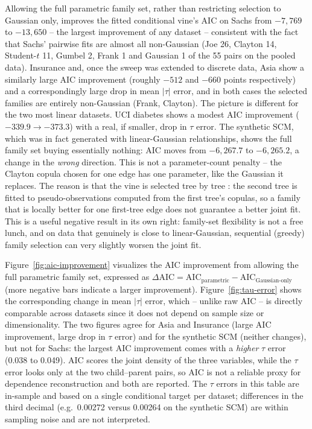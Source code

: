 \documentclass[
  english,
  class=report,
  accentcolor=2c,
  marginpar=false,
  parskip=half-,
  fontsize=11pt,
  ruledheaders=false,
  pdfa=false,
  IMRAD=false,
  thesis={type=master}
]{tudapub}
\begin{document}
Allowing the full parametric family set, rather than restricting selection
to Gaussian only, improves the fitted conditional vine's AIC on Sachs from
$-7{,}769$ to $-13{,}650$ -- the largest improvement of any dataset -- consistent
with the fact that Sachs' pairwise fits are almost all non-Gaussian (Joe 26,
Clayton 14, Student-$t$ 11, Gumbel 2, Frank 1 and Gaussian 1 of the 55 pairs
on the pooled data). Insurance and, once the
sweep was extended to discrete data, Asia show a similarly large AIC
improvement (roughly $-512$ and $-660$ points respectively) and a
correspondingly large drop in mean $|\tau|$ error, and in both cases the
selected families are entirely non-Gaussian (Frank, Clayton). The picture
is different for the two most linear datasets. UCI diabetes shows a modest
AIC improvement ($-339.9 \to -373.3$) with a real, if smaller, drop in
$\tau$ error. The synthetic SCM, which was in fact generated with linear-Gaussian
relationships, shows the full family set buying essentially
nothing: AIC moves from $-6{,}267.7$ to $-6{,}265.2$, a change in the
\emph{wrong} direction. This is not a parameter-count penalty -- the
Clayton copula chosen for one edge has one parameter, like the Gaussian it
replaces. The reason is that the vine is selected tree by tree
\parencite{dissmann2013}: the second
tree is fitted to pseudo-observations computed from the first tree's
copulas, so a family that is locally better for one first-tree edge does not
guarantee a better joint fit. This is a useful negative result in its own
right: family-set flexibility is not a free lunch, and on data that
genuinely is close to linear-Gaussian, sequential (greedy) family selection
can very slightly worsen the joint fit.

Figure~\ref{fig:aic-improvement} visualizes the AIC improvement from
allowing the full parametric family set, expressed as $\Delta\text{AIC} =
\text{AIC}_{\text{parametric}} - \text{AIC}_{\text{Gaussian-only}}$ (more
negative bars indicate a larger improvement). Figure~\ref{fig:tau-error}
shows the corresponding change in mean $|\tau|$ error, which -- unlike raw
AIC -- is directly comparable across datasets since it does not depend on
sample size or dimensionality. The two figures agree for Asia and Insurance
(large AIC improvement, large drop in $\tau$ error) and for the synthetic
SCM (neither changes), but not for Sachs: the largest AIC improvement comes
with a \emph{higher} $\tau$ error (0.038 to 0.049). AIC scores the joint
density of the three variables, while the $\tau$ error looks only at the two
child--parent pairs, so AIC is not a reliable proxy for dependence
reconstruction and both are reported. The $\tau$ errors in this table are
in-sample and based on a single conditional target per dataset; differences
in the third decimal (e.g.\ 0.00272 versus 0.00264 on the synthetic SCM)
are within sampling noise and are not interpreted.
\end{document}
